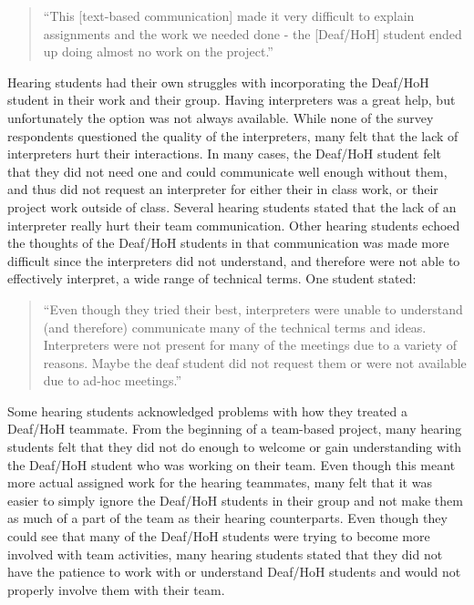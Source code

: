 \documentclass[conference]{IEEEtran}
\begin{document}
\begin{quotation}
``This [text-based communication] made it very difficult to explain assignments and the work we needed done - the [Deaf/HoH] student ended up doing almost no work on the project.''
\end{quotation}

Hearing students had their own struggles with incorporating the Deaf/HoH student in their work and their group. Having interpreters was a great help, but unfortunately the option was not always available. While none of the survey respondents questioned the quality of the interpreters, many felt that the lack of interpreters hurt their interactions. In many cases, the Deaf/HoH student felt that they did not need one and could communicate well enough without them, and thus did not request an interpreter for either their in class work, or their project work outside of class. Several hearing students stated that the lack of an interpreter really hurt their team communication. Other hearing students echoed the thoughts of the Deaf/HoH students in that communication was made more difficult since the interpreters did not understand, and therefore were not able to effectively interpret, a wide range of technical terms. One student stated:

\begin{quotation}
``Even though they tried their best, interpreters were unable to understand (and therefore) communicate many of the technical terms and ideas. Interpreters were not present for many of the meetings due to a variety of reasons. Maybe the deaf student did not request them or were not available due to ad-hoc meetings.''
\end{quotation}

Some hearing students acknowledged problems with how they treated a Deaf/HoH teammate. From the beginning of a team-based project, many hearing students felt that they did not do enough to welcome or gain understanding with the Deaf/HoH student who was working on their team. Even though this meant more actual assigned work for the hearing teammates, many felt that it was easier to simply ignore the Deaf/HoH students in their group and not make them as much of a part of the team as their hearing counterparts. Even though they could see that many of the Deaf/HoH students were trying to become more involved with team activities, many hearing students stated that they did not have the patience to work with or understand Deaf/HoH students and would not properly involve them with their team.
\end{document}
